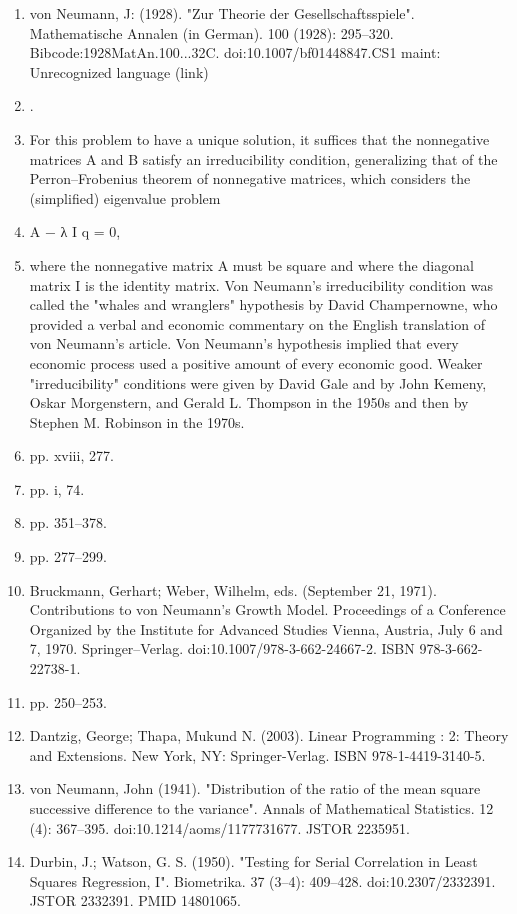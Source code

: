 \begin{enumerate}
\item von Neumann, J: (1928). "Zur Theorie der Gesellschaftsspiele". Mathematische Annalen (in German). 100 (1928): 295–320. Bibcode:1928MatAn.100...32C. doi:10.1007/bf01448847.CS1 maint: Unrecognized language (link)
\item .
\item For this problem to have a unique solution, it suffices that the nonnegative matrices A and B satisfy an irreducibility condition, generalizing that of the Perron–Frobenius theorem of nonnegative matrices, which considers the (simplified) eigenvalue problem
\item A − λ I q = 0,
\item where the nonnegative matrix A must be square and where the diagonal matrix I is the identity matrix. Von Neumann's irreducibility condition was called the "whales and wranglers" hypothesis by David Champernowne, who provided a verbal and economic commentary on the English translation of von Neumann's article. Von Neumann's hypothesis implied that every economic process used a positive amount of every economic good. Weaker "irreducibility" conditions were given by David Gale and by John Kemeny, Oskar Morgenstern, and Gerald L. Thompson in the 1950s and then by Stephen M. Robinson in the 1970s.
\item  pp. xviii, 277.
\item  pp. i, 74.
\item  pp. 351–378.
\item  pp. 277–299.
\item Bruckmann, Gerhart; Weber, Wilhelm, eds. (September 21, 1971). Contributions to von Neumann's Growth Model. Proceedings of a Conference Organized by the Institute for Advanced Studies Vienna, Austria, July 6 and 7, 1970. Springer–Verlag. doi:10.1007/978-3-662-24667-2. ISBN 978-3-662-22738-1.
\item  pp. 250–253.
\item Dantzig, George; Thapa, Mukund N. (2003). Linear Programming : 2: Theory and Extensions. New York, NY: Springer-Verlag. ISBN 978-1-4419-3140-5.
\item von Neumann, John (1941). "Distribution of the ratio of the mean square successive difference to the variance". Annals of Mathematical Statistics. 12 (4): 367–395. doi:10.1214/aoms/1177731677. JSTOR 2235951.
\item Durbin, J.; Watson, G. S. (1950). "Testing for Serial Correlation in Least Squares Regression, I". Biometrika. 37 (3–4): 409–428. doi:10.2307/2332391. JSTOR 2332391. PMID 14801065.

\end{enumerate}
